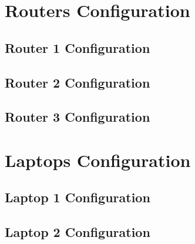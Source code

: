\appendix

\begingroup

\chapter{Routers Configuration}
\label{app:routers}

\section{Router 1 Configuration}
\label{app:sec:router1}


\clearpage

\section{Router 2 Configuration}
\label{app:sec:router2}

\clearpage


\section{Router 3 Configuration}
\label{app:sec:router3}




\chapter{Laptops Configuration}
\label{app:laptops}


\section{Laptop 1 Configuration}
\label{app:sec:laptop1}

\clearpage

\section{Laptop 2 Configuration}
\label{app:sec:laptop2}

\clearpage

